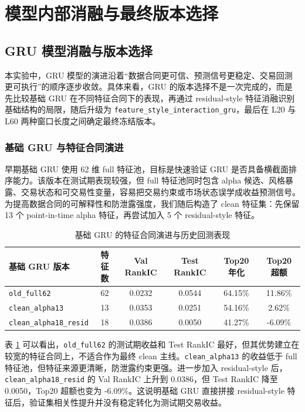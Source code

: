 \documentclass[12pt,a4paper,cn,bibtex]{elegantpaper}
\newcommand{\modelname}[1]{\nolinkurl{#1}}
\begin{document}
\section{模型内部消融与最终版本选择}

\subsection{GRU 模型消融与版本选择}
本实验中，GRU 模型的演进沿着“数据合同更可信、预测信号更稳定、交易回测更可执行”的顺序逐步收敛。具体来看，GRU 的版本选择不是一次完成的，而是先比较基础 GRU 在不同特征合同下的表现，再通过 residual-style 特征消融识别基础结构的局限，随后升级为 \modelname{feature\_style\_interaction\_gru}，最后在 L20 与 L60 两种窗口长度之间确定最终冻结版本。

\subsubsection{基础 GRU 与特征合同演进}

早期基础 GRU 使用 62 维 full 特征池，目标是快速验证 GRU 是否具备横截面排序能力。该版本在测试期表现较强，但 full 特征池同时包含 alpha 候选、风格暴露、交易状态和可交易性变量，容易把交易约束或市场状态误学成收益预测信号。为提高数据合同的可解释性和防泄露强度，我们随后构造了 clean 特征集：先保留 13 个 point-in-time alpha 特征，再尝试加入 5 个 residual-style 特征。

\begin{table}[H]
    \centering
    \small
    \setlength{\tabcolsep}{4pt}
    \begin{tabularx}{\textwidth}{Xccccc}
        \toprule
        \textbf{基础 GRU 版本} & \textbf{特征数} & \textbf{Val RankIC} & \textbf{Test RankIC} & \textbf{Top20 年化} & \textbf{Top20 超额} \\
        \midrule
        \modelname{old\_full62} & 62 & 0.0232 & 0.0544 & 64.15\% & 11.86\% \\
        \modelname{clean\_alpha13} & 13 & 0.0353 & 0.0251 & 54.16\% & 2.62\% \\
        \modelname{clean\_alpha18\_resid} & 18 & 0.0386 & 0.0050 & 41.27\% & -6.09\% \\
        \bottomrule
    \end{tabularx}
    \caption{基础 GRU 的特征合同演进与历史回测表现}
    \label{tab:gru-feature-evolution}
\end{table}

表 \ref{tab:gru-feature-evolution} 可以看出，\modelname{old\_full62} 的测试期收益和 Test RankIC 最好，但其优势建立在较宽的特征合同上，不适合作为最终 clean 主线。\modelname{clean\_alpha13} 的收益低于 full 特征池，但特征来源更清晰，防泄露约束更强。进一步加入 residual-style 后，\modelname{clean\_alpha18\_resid} 的 Val RankIC 上升到 0.0386，但 Test RankIC 降至 0.0050，Top20 超额也变为 -6.09\%。这说明基础 GRU 直接拼接 residual-style 特征后，验证集相关性提升并没有稳定转化为测试期交易收益。
\end{document}
